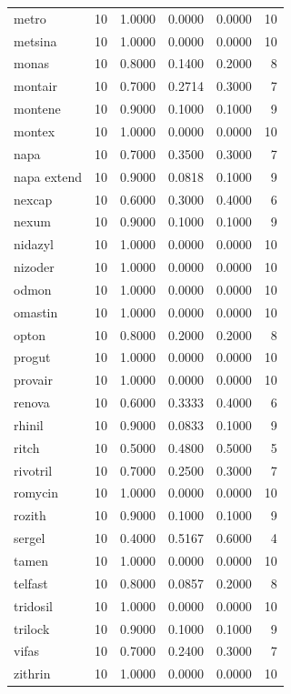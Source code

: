 \begin{longtable}{p{3.0cm}rrrrr}
metro & 10 & 1.0000 & 0.0000 & 0.0000 & 10 \\
metsina & 10 & 1.0000 & 0.0000 & 0.0000 & 10 \\
monas & 10 & 0.8000 & 0.1400 & 0.2000 & 8 \\
montair & 10 & 0.7000 & 0.2714 & 0.3000 & 7 \\
montene & 10 & 0.9000 & 0.1000 & 0.1000 & 9 \\
montex & 10 & 1.0000 & 0.0000 & 0.0000 & 10 \\
napa & 10 & 0.7000 & 0.3500 & 0.3000 & 7 \\
napa extend & 10 & 0.9000 & 0.0818 & 0.1000 & 9 \\
nexcap & 10 & 0.6000 & 0.3000 & 0.4000 & 6 \\
nexum & 10 & 0.9000 & 0.1000 & 0.1000 & 9 \\
nidazyl & 10 & 1.0000 & 0.0000 & 0.0000 & 10 \\
nizoder & 10 & 1.0000 & 0.0000 & 0.0000 & 10 \\
odmon & 10 & 1.0000 & 0.0000 & 0.0000 & 10 \\
omastin & 10 & 1.0000 & 0.0000 & 0.0000 & 10 \\
opton & 10 & 0.8000 & 0.2000 & 0.2000 & 8 \\
progut & 10 & 1.0000 & 0.0000 & 0.0000 & 10 \\
provair & 10 & 1.0000 & 0.0000 & 0.0000 & 10 \\
renova & 10 & 0.6000 & 0.3333 & 0.4000 & 6 \\
rhinil & 10 & 0.9000 & 0.0833 & 0.1000 & 9 \\
ritch & 10 & 0.5000 & 0.4800 & 0.5000 & 5 \\
rivotril & 10 & 0.7000 & 0.2500 & 0.3000 & 7 \\
romycin & 10 & 1.0000 & 0.0000 & 0.0000 & 10 \\
rozith & 10 & 0.9000 & 0.1000 & 0.1000 & 9 \\
sergel & 10 & 0.4000 & 0.5167 & 0.6000 & 4 \\
tamen & 10 & 1.0000 & 0.0000 & 0.0000 & 10 \\
telfast & 10 & 0.8000 & 0.0857 & 0.2000 & 8 \\
tridosil & 10 & 1.0000 & 0.0000 & 0.0000 & 10 \\
trilock & 10 & 0.9000 & 0.1000 & 0.1000 & 9 \\
vifas & 10 & 0.7000 & 0.2400 & 0.3000 & 7 \\
zithrin & 10 & 1.0000 & 0.0000 & 0.0000 & 10 \\
\end{longtable}
\endgroup
